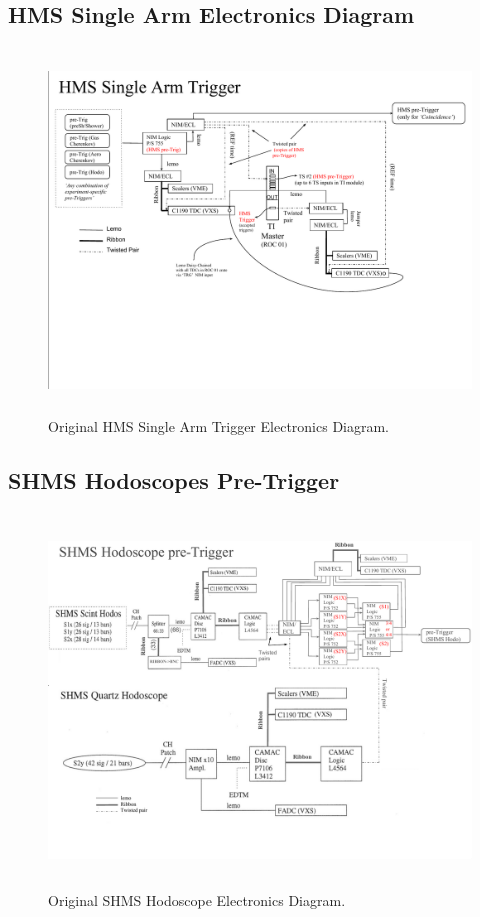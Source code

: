 \documentclass[11pt]{article}
\begin{document}
\begin{appendices}
\subsection{HMS Single Arm Electronics Diagram}
\label{appendix:Appx5}
\begin{figure}[h!]
  \centering
  \includegraphics[width=7.0in, height=3.8in]{../HMS_SingleArm_Trigger.pdf}
  \caption{Original HMS Single Arm Trigger Electronics Diagram.}
  \label{fig:hms_one_arm_trg}
\end{figure}
\subsection{SHMS Hodoscopes Pre-Trigger}
\label{appendix:Appx6}
\begin{figure}[h!]
  \centering
  \includegraphics[width=6.8in, height=3.9in]{../SHMS_HODO_TRIGGER.pdf}
  \caption{Original SHMS Hodoscope Electronics Diagram.}
  \label{fig:shms_hod_trg}
\end{figure}
\newpage

\end{appendices}
\end{document}
